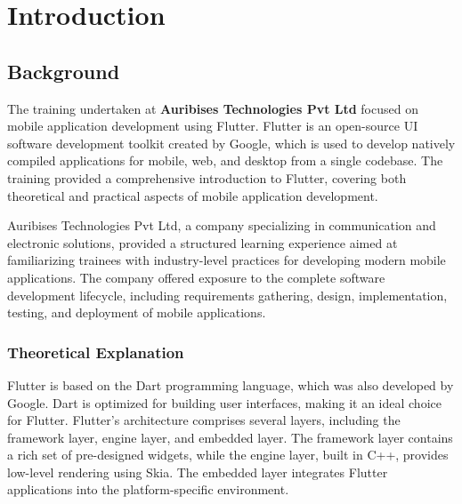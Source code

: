 \documentclass[12pt,a4paper]{report}
\begin{document}
\newpage

\chapter*{}
\listoffigures
\chapter*{}
\listoftables
\newpage

\setcounter{tocdepth}{1}
\setlength{\cftbeforechapskip}{0pt} 
\setlength{\cftbeforesecskip}{0pt} 
\setlength{\cftbeforetoctitleskip}{-1em} 
\tableofcontents


\chapter{Introduction}

\section{Background}
The training undertaken at \textbf{Auribises Technologies Pvt Ltd} focused on mobile application development using Flutter. Flutter is an open-source UI software development toolkit created by Google, which is used to develop natively compiled applications for mobile, web, and desktop from a single codebase. The training provided a comprehensive introduction to Flutter, covering both theoretical and practical aspects of mobile application development.

Auribises Technologies Pvt Ltd, a company specializing in communication and electronic solutions, provided a structured learning experience aimed at familiarizing trainees with industry-level practices for developing modern mobile applications. The company offered exposure to the complete software development lifecycle, including requirements gathering, design, implementation, testing, and deployment of mobile applications.

\subsection{Theoretical Explanation}
Flutter is based on the Dart programming language, which was also developed by Google. Dart is optimized for building user interfaces, making it an ideal choice for Flutter. Flutter’s architecture comprises several layers, including the framework layer, engine layer, and embedded layer. The framework layer contains a rich set of pre-designed widgets, while the engine layer, built in C++, provides low-level rendering using Skia. The embedded layer integrates Flutter applications into the platform-specific environment.
\end{document}

